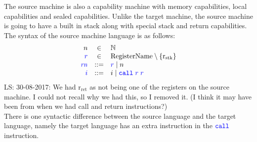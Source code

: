 \documentclass[a4paper]{article}
\newcommand\lau[1]{{\color{purple} \sf \footnotesize {LS: #1}}\\}
\newcommand{\defbnf}{::=}
\newcommand{\sourcecolor}[1]{\color{blue}}
\newcommand{\src}[1]{{\sourcecolor{} #1}}
\newcommand{\targetcolor}[1]{\color{black}}
\newcommand{\trg}[1]{{\targetcolor{} #1}}
\newcommand{\zinstr}[1]{\texttt{#1}}
\newcommand{\twoinstr}[3]{
  \ifthenelse{\equal{#2#3}{}}
  {\zinstr{#1}}
  {\zinstr{#1} \; #2 \; #3}
}
\newcommand{\scall}[2]{\twoinstr{\src{call}}{#1}{#2}}
\newcommand{\nats}{\mathbb{N}}
\newcommand{\shareddom}[1]{\mathrm{#1}}
\newcommand{\RegName}{\shareddom{RegisterName}}
\newcommand{\var}[1]{\mathit{#1}}
\newcommand{\rn}{\var{rn}}
\newcommand{\rstk}{\mathrm{r}_\mathrm{stk}}
\newcommand{\rO}{\mathrm{r}_\mathrm{ret}}
\newcommand{\rret}{\rO}
\begin{document}
The source machine is also a capability machine with memory capabilities, local capabilities and sealed capabilities. Unlike the target machine, the source machine is going to have a built in stack along with special stack and return capabilities. The syntax of the source machine language is as follows:
\[
  \begin{array}{rcl}
    n & \in & \nats \\
    \src{r} &\in &  \RegName \setminus \{\rstk\}\\
    \src{\rn} &\defbnf & \src{r} \mid n \\
    \src{i} & \defbnf &  \trg{i} \mid \scall{\src{r}}{\src{r}}
  \end{array}
\]
\lau{30-08-2017: We had $\rret$ as not being one of the registers on the source machine. I could not recall why we had this, so I removed it. (I think it may have been from when we had call and return instructions?)}
There is one syntactic difference between the source language and the target language, namely the target language has an extra instruction in the $\scall{}{}$ instruction.
\end{document}
